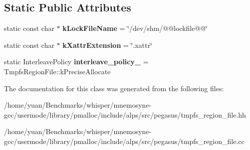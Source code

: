 \subsection*{Static Public Attributes}
\begin{DoxyCompactItemize}
\item 
static const char $\ast$ {\bfseries k\+Lock\+File\+Name} = \char`\"{}/dev/shm/@@lockfile@@\char`\"{}\hypertarget{classalps_1_1TmpfsRegionFile_a95e31e53958f0fb9e6989bfd4f4c33c6}{}\label{classalps_1_1TmpfsRegionFile_a95e31e53958f0fb9e6989bfd4f4c33c6}

\item 
static const char $\ast$ {\bfseries k\+Xattr\+Extension} = \char`\"{}.xattr\char`\"{}\hypertarget{classalps_1_1TmpfsRegionFile_a41052c07862762ae01b6dde6aea3c1d7}{}\label{classalps_1_1TmpfsRegionFile_a41052c07862762ae01b6dde6aea3c1d7}

\item 
static Interleave\+Policy {\bfseries interleave\+\_\+policy\+\_\+} = Tmpfs\+Region\+File\+::k\+Precise\+Allocate\hypertarget{classalps_1_1TmpfsRegionFile_a0ba492a78a1ea43617083b958ef61ab6}{}\label{classalps_1_1TmpfsRegionFile_a0ba492a78a1ea43617083b958ef61ab6}

\end{DoxyCompactItemize}


The documentation for this class was generated from the following files\+:\begin{DoxyCompactItemize}
\item 
/home/yuan/\+Benchmarks/whisper/mnemosyne-\/gcc/usermode/library/pmalloc/include/alps/src/pegasus/tmpfs\+\_\+region\+\_\+file.\+hh\item 
/home/yuan/\+Benchmarks/whisper/mnemosyne-\/gcc/usermode/library/pmalloc/include/alps/src/pegasus/tmpfs\+\_\+region\+\_\+file.\+cc\end{DoxyCompactItemize}
